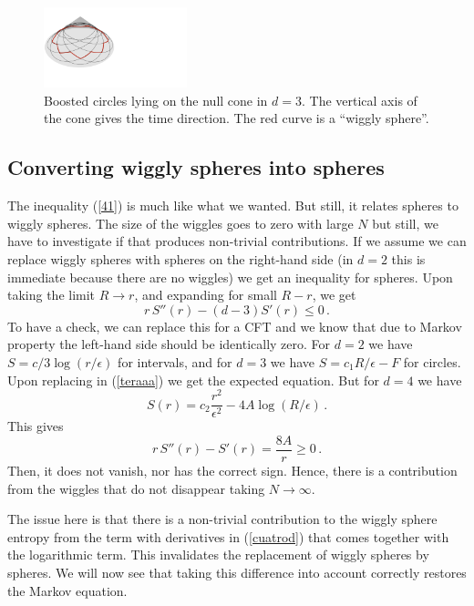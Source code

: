 \documentclass[11pt]{article}
\numberwithin{equation}{section}
\newcommand{\be}{\begin{equation}}
\newcommand{\ee}{\end{equation}}
\begin{document}
\begin{figure}[t]
\begin{center}
\includegraphics[width=0.37\textwidth]{boosted.pdf} 
\caption{Boosted circles lying on the null cone in $d=3$. The vertical axis of the cone gives the time direction. The red curve is a ``wiggly sphere''. }
\label{boosted}
\end{center}
\end{figure}

\subsection{Converting wiggly spheres into spheres}

The inequality (\ref{41}) is much like what we wanted. But still, it relates spheres to wiggly spheres. The size of the wiggles goes to zero with large $N$ but still, we have to investigate if that produces non-trivial contributions. If we assume we can replace wiggly spheres with spheres on the right-hand side (in $d=2$ this is immediate because there are no wiggles) we get an inequality for spheres. Upon taking the limit $R\rightarrow r$, and expanding for small $R-r$, we get
\be
r\, S''(r) -(d-3) S'(r)\le 0\,. \label{teraaa}
\ee
To have a check, we can replace this for a CFT and we know that due to Markov property the left-hand side should be identically zero. For $d=2$ we have $S=c/3 \log (r/\epsilon)$ for intervals, and for $d=3$ we have $S= c_1 R/\epsilon-F$ for circles. Upon replacing in (\ref{teraaa}) we get the expected equation. But for $d=4$ we have 
\be
S(r)=c_2 \frac{r^2}{\epsilon^2}-4 A \log(R/\epsilon)\,.
\ee
 This gives
\be
r\, S''(r) - S'(r)=\frac{8A}{r}\ge 0 \,.
\ee
Then, it does not vanish, nor has the correct sign. Hence, there is a contribution from the wiggles that do not disappear taking $N\rightarrow \infty$. 

The issue here is that there is a non-trivial contribution to the wiggly sphere entropy from the term with derivatives in (\ref{cuatrod}) that comes together with the logarithmic term. This invalidates the replacement of wiggly spheres by spheres. We will now see that taking this difference into account correctly restores the Markov equation.
\end{document}
